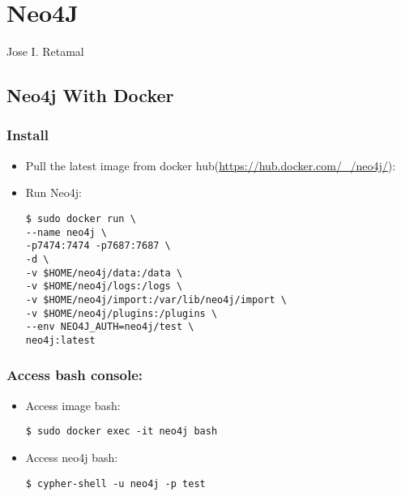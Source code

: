 \chapter{Neo4J}{Jose I. Retamal }


\section {Neo4j With Docker}

\subsection{Install}
\begin{itemize}
\item Pull the latest image from docker hub(\url{https://hub.docker.com/_/neo4j/}):
	
	

	
	
\item Run Neo4j:
	
\begin{verbatim}
$ sudo docker run \
--name neo4j \
-p7474:7474 -p7687:7687 \
-d \
-v $HOME/neo4j/data:/data \
-v $HOME/neo4j/logs:/logs \
-v $HOME/neo4j/import:/var/lib/neo4j/import \
-v $HOME/neo4j/plugins:/plugins \
--env NEO4J_AUTH=neo4j/test \
neo4j:latest
\end{verbatim}

\end{itemize}	
\subsection{Access bash console:}	
\begin{itemize}
	\item Access image bash:
	
\begin{verbatim}
$ sudo docker exec -it neo4j bash
\end{verbatim}
	
	
	\item Access neo4j bash:
	
\begin{verbatim}
$ cypher-shell -u neo4j -p test
\end{verbatim}

\end{itemize}	
	
